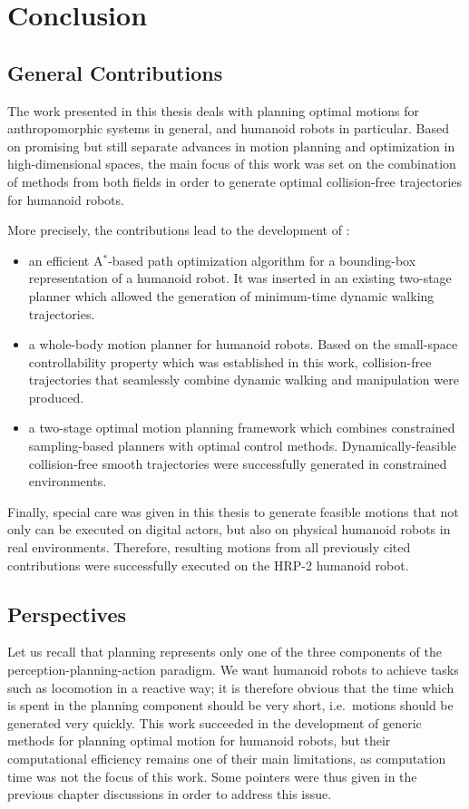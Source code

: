 \chapter{Conclusion}
\label{chap:conclusion}

\section{General Contributions}

The work presented in this thesis deals with planning optimal motions
for anthropomorphic systems in general, and humanoid robots in
particular. Based on promising but still separate advances in motion
planning and optimization in high-dimensional spaces, the main focus
of this work was set on the combination of methods from both fields in
order to generate optimal collision-free trajectories for humanoid
robots.

More precisely, the contributions lead to the development of :
\begin{itemize}
\item an efficient A$^*$-based path optimization algorithm for a
  bounding-box representation of a humanoid robot. It was inserted in
  an existing two-stage planner which allowed the generation of
  minimum-time dynamic walking trajectories.
\item a whole-body motion planner for humanoid robots. Based on the
  small-space controllability property which was established in this
  work, collision-free trajectories that seamlessly combine dynamic
  walking and manipulation were produced.
\item a two-stage optimal motion planning framework which combines
  constrained sampling-based planners with optimal control
  methods. Dynamically-feasible collision-free smooth trajectories
  were successfully generated in constrained environments.
\end{itemize}

Finally, special care was given in this thesis to generate feasible
motions that not only can be executed on digital actors, but also on
physical humanoid robots in real environments. Therefore, resulting
motions from all previously cited contributions were successfully
executed on the HRP-2 humanoid robot.

\section{Perspectives}

Let us recall that planning represents only one of the three
components of the perception-planning-action paradigm. We want
humanoid robots to achieve tasks such as locomotion in a reactive way;
it is therefore obvious that the time which is spent in the planning
component should be very short, i.e.\ motions should be generated very
quickly. This work succeeded in the development of generic methods for
planning optimal motion for humanoid robots, but their computational
efficiency remains one of their main limitations, as computation time
was not the focus of this work. Some pointers were thus given in the
previous chapter discussions in order to address this issue.

